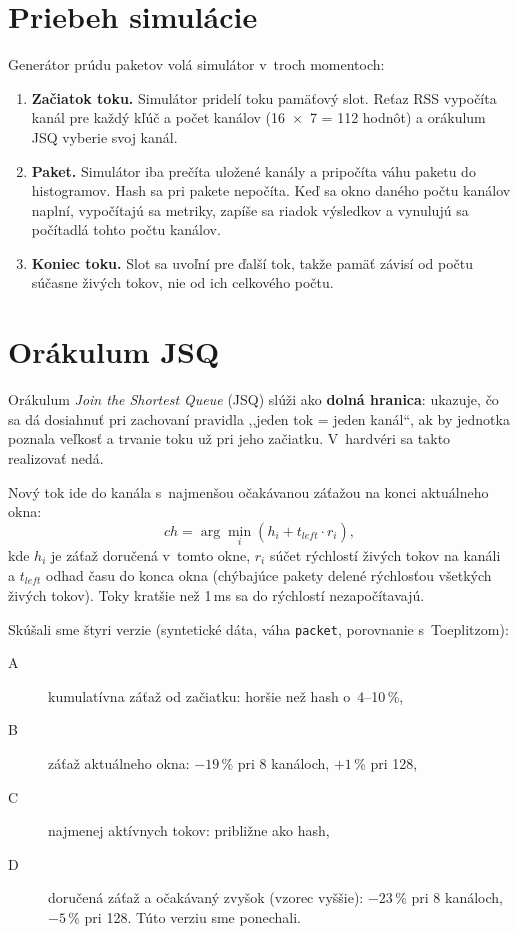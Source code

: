 \section{Priebeh simulácie}

Generátor prúdu paketov volá simulátor v~troch momentoch:

\begin{enumerate}
  \item \textbf{Začiatok toku.} Simulátor pridelí toku pamäťový slot. Reťaz RSS vypočíta
        kanál pre každý kľúč a počet kanálov (16~$\times$~7 = 112 hodnôt) a orákulum JSQ
        vyberie svoj kanál.
  \item \textbf{Paket.} Simulátor iba prečíta uložené kanály a pripočíta váhu paketu do
        histogramov. Hash sa pri pakete nepočíta. Keď sa okno daného počtu kanálov naplní,
        vypočítajú sa metriky, zapíše sa riadok výsledkov a vynulujú sa počítadlá tohto
        počtu kanálov.
  \item \textbf{Koniec toku.} Slot sa uvoľní pre ďalší tok, takže pamäť závisí od počtu
        súčasne živých tokov, nie od ich celkového počtu.
\end{enumerate}

\section{Orákulum JSQ}
\label{sec:jsq}

Orákulum \emph{Join the Shortest Queue} (JSQ) slúži ako \textbf{dolná hranica}: ukazuje, čo
sa dá dosiahnuť pri zachovaní pravidla ,,jeden tok = jeden kanál``, ak by jednotka poznala
veľkosť a trvanie toku už pri jeho začiatku. V~hardvéri sa takto realizovať nedá.

Nový tok ide do kanála s~najmenšou očakávanou záťažou na konci aktuálneho okna:
\begin{equation}
  \mathit{ch} = \arg\min_{i} \left( h_i + t_\mathit{left} \cdot r_i \right) ,
\end{equation}
kde $h_i$ je záťaž doručená v~tomto okne, $r_i$ súčet rýchlostí živých tokov na kanáli a
$t_\mathit{left}$ odhad času do konca okna (chýbajúce pakety delené rýchlosťou všetkých živých
tokov). Toky kratšie než 1\,ms sa do rýchlostí nezapočítavajú.

Skúšali sme štyri verzie (syntetické dáta, váha \texttt{packet}, porovnanie s~Toeplitzom):

\begin{description}
  \item[A] kumulatívna záťaž od začiatku: horšie než hash o~4--10\,\%,
  \item[B] záťaž aktuálneho okna: $-19$\,\% pri 8 kanáloch, $+1$\,\% pri 128,
  \item[C] najmenej aktívnych tokov: približne ako hash,
  \item[D] doručená záťaž a očakávaný zvyšok (vzorec vyššie): $-23$\,\% pri 8 kanáloch,
        $-5$\,\% pri 128. Túto verziu sme ponechali.
\end{description}

